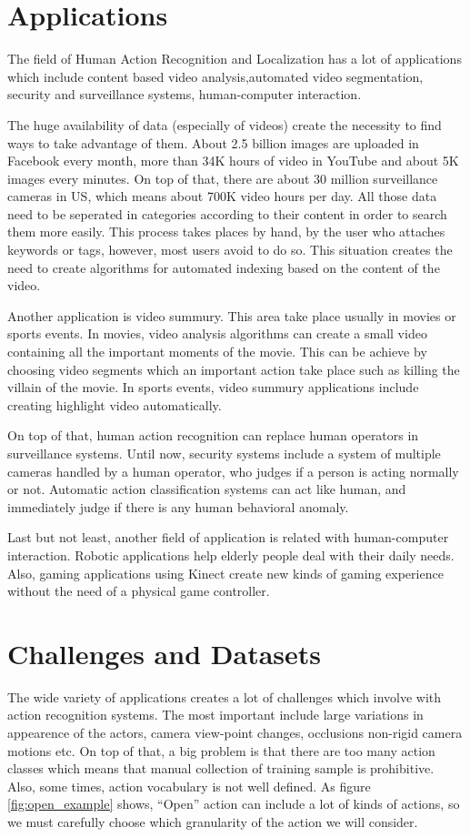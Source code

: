 \section{Applications}
The field of Human Action Recognition and Localization has a lot of applications which include 
 content based video analysis,automated video segmentation, security and surveillance systems,
human-computer interaction.

The huge availability of data (especially of videos) create the  necessity to find ways to take advantage of them.
About 2.5 billion images are uploaded in Facebook every month, more than 34K hours of video in YouTube and
about 5K images every minutes. On top of that, there are about 30 million surveillance cameras in US, which means
about 700K video hours per day. All those data need to be seperated in categories according to their content in
order to search them more easily. This process takes places by hand, by the user who attaches
keywords or tags, however, most users avoid to do so. This situation creates the need to create algorithms for
automated indexing based on the content of the video.

Another application is video summury. This area take place usually in movies or sports events. In movies,
video analysis algorithms can create a small video containing all the important moments of the movie. This
can be achieve by choosing video segments which an important action take place such as killing the villain
of the movie. In sports events, video summury applications include creating highlight video automatically.

On top of that, human action recognition can replace human operators in surveillance systems. Until now,
security systems include a system of multiple cameras handled by a human operator, who judges if a person
is acting normally or not. Automatic action classification systems can act like human, and immediately
judge if there is any human behavioral anomaly.

Last but not least, another field of application is related with human-computer interaction. Robotic applications
help elderly people deal with their daily needs. Also, gaming applications using Kinect create new kinds of
gaming experience without the need of a physical game controller.

\section{Challenges and Datasets}
The wide variety of applications creates a lot of challenges which involve with action recognition systems.
The most important include large variations in appearence of the actors, camera view-point changes, occlusions
non-rigid camera motions etc. On top of that, a big problem is that there are too many action classes which means
that manual collection of training sample is prohibitive. Also, some times, action vocabulary is not well defined.
As figure \ref{fig:open_example} shows, ``Open'' action can include a lot of kinds of actions, so we must carefully
choose which granularity of the action we will consider.

